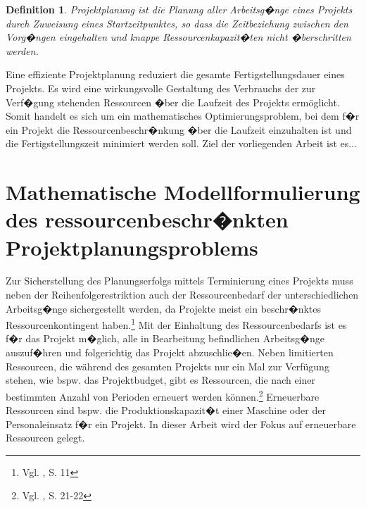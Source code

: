 \documentclass[a4paper,12pt,parskip,bibtotoc,liststotoc]{article}
\newtheorem{mydef}{Definition}
\begin{document}
\begin{mydef}
\glqq Projektplanung ist die Planung aller Arbeitsg�nge eines Projekts durch Zuweisung eines Startzeitpunktes, so dass die Zeitbeziehung zwischen den Vorg�ngen eingehalten und knappe Ressourcenkapazit�ten nicht �berschritten werden.\grqq{}
\end{mydef}

Eine effiziente Projektplanung reduziert die gesamte Fertigstellungsdauer eines Projekts. Es wird eine wirkungsvolle Gestaltung des Verbrauchs der zur Verf�gung stehenden Ressourcen �ber die Laufzeit des Projekts ermöglicht. Somit handelt es sich um ein mathematisches Optimierungsproblem, bei dem f�r ein Projekt die Ressourcenbeschr�nkung �ber die Laufzeit einzuhalten ist und die Fertigstellungszeit minimiert werden soll.
Ziel der vorliegenden Arbeit ist es...

\section{Mathematische Modellformulierung des ressourcenbeschr�nkten Projektplanungsproblems} \label{Grund}
Zur Sicherstellung des Planungserfolgs mittels Terminierung eines Projekts muss neben der Reihenfolgerestriktion auch der Ressourcenbedarf der unterschiedlichen Arbeitsg�nge sichergestellt werden, da Projekte meist ein beschr�nktes Ressourcenkontingent haben.\footnote{Vgl. \cite{kellenbrink2014einfuhrung}, S. 11} Mit der Einhaltung des Ressourcenbedarfs ist es f�r das Projekt m�glich, alle in Bearbeitung befindlichen Arbeitsg�nge auszuf�hren und folgerichtig das Projekt abzuschlie�en. Neben limitierten Ressourcen, die während des gesamten Projekts nur ein Mal zur Verfügung stehen, wie bspw. das Projektbudget, gibt es Ressourcen, die nach einer bestimmten Anzahl von Perioden erneuert werden können.\footnote{Vgl. \cite{neumann2003project}, S. 21-22} Erneuerbare Ressourcen sind bspw. die Produktionskapazit�t einer Maschine oder der Personaleinsatz f�r ein Projekt. In dieser Arbeit wird der Fokus auf erneuerbare Ressourcen gelegt.\\
\end{document}
